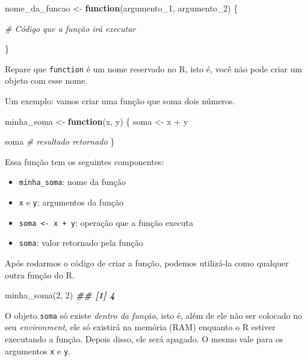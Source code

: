\documentclass[
]{book}
\newenvironment{Shaded}{\begin{snugshade}}{\end{snugshade}}
\newcommand{\CommentTok}[1]{\textcolor[rgb]{0.56,0.35,0.01}{\textit{#1}}}
\newcommand{\ControlFlowTok}[1]{\textcolor[rgb]{0.13,0.29,0.53}{\textbf{#1}}}
\newcommand{\DecValTok}[1]{\textcolor[rgb]{0.00,0.00,0.81}{#1}}
\newcommand{\DocumentationTok}[1]{\textcolor[rgb]{0.56,0.35,0.01}{\textbf{\textit{#1}}}}
\newcommand{\FunctionTok}[1]{\textcolor[rgb]{0.00,0.00,0.00}{#1}}
\newcommand{\NormalTok}[1]{#1}
\newcommand{\OtherTok}[1]{\textcolor[rgb]{0.56,0.35,0.01}{#1}}
\newcommand{\SpecialCharTok}[1]{\textcolor[rgb]{0.00,0.00,0.00}{#1}}
\providecommand{\tightlist}{%
  \setlength{\itemsep}{0pt}\setlength{\parskip}{0pt}}
\begin{document}
\begin{Shaded}
\begin{Highlighting}[]
\NormalTok{nome\_da\_funcao }\OtherTok{\textless{}{-}} \ControlFlowTok{function}\NormalTok{(argumento\_1, argumento\_2) \{}
  
  \CommentTok{\# Código que a função irá executar}
  
\NormalTok{\}}
\end{Highlighting}
\end{Shaded}

Repare que \texttt{function} é um nome reservado no R, isto é, você não pode criar um objeto com esse nome.

Um exemplo: vamos criar uma função que soma dois números.

\begin{Shaded}
\begin{Highlighting}[]
\NormalTok{minha\_soma }\OtherTok{\textless{}{-}} \ControlFlowTok{function}\NormalTok{(x, y) \{}
\NormalTok{  soma }\OtherTok{\textless{}{-}}\NormalTok{ x }\SpecialCharTok{+}\NormalTok{ y}
  
\NormalTok{  soma  }\CommentTok{\# resultado retornado}
\NormalTok{\}}
\end{Highlighting}
\end{Shaded}

Essa função tem os seguintes componentes:

\begin{itemize}
\tightlist
\item
  \texttt{minha\_soma}: nome da função
\item
  \texttt{x} e \texttt{y}: argumentos da função
\item
  \texttt{soma\ \textless{}-\ x\ +\ y}: operação que a função executa
\item
  \texttt{soma}: valor retornado pela função
\end{itemize}

Após rodarmos o código de criar a função, podemos utilizá-la como qualquer outra função do R.

\begin{Shaded}
\begin{Highlighting}[]
\FunctionTok{minha\_soma}\NormalTok{(}\DecValTok{2}\NormalTok{, }\DecValTok{2}\NormalTok{)}
\DocumentationTok{\#\# [1] 4}
\end{Highlighting}
\end{Shaded}

O objeto \texttt{soma} só existe \emph{dentro da função}, isto é, além de ele não ser colocado no seu \emph{environment}, ele só existirá na memória (RAM) enquanto o R estiver executando a função. Depois disso, ele será apagado. O mesmo vale para os argumentos \texttt{x} e \texttt{y}.
\end{document}
